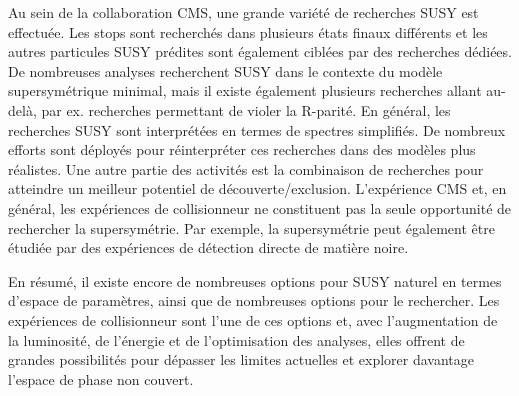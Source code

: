 Au sein de la collaboration CMS, une grande variété de recherches SUSY est effectuée. Les stops sont recherchés dans plusieurs états finaux différents et les autres particules SUSY prédites sont également ciblées par des recherches dédiées. De nombreuses analyses recherchent SUSY dans le contexte du modèle supersymétrique minimal, mais il existe également plusieurs recherches allant au-delà, par ex. recherches permettant de violer la R-parité. En général, les recherches SUSY sont interprétées en termes de spectres simplifiés. De nombreux efforts sont déployés pour réinterpréter ces recherches dans des modèles plus réalistes. Une autre partie des activités est la combinaison de recherches pour atteindre un meilleur potentiel de découverte/exclusion. L'expérience CMS et, en général, les expériences de collisionneur ne constituent pas la seule opportunité de rechercher la supersymétrie. Par exemple, la supersymétrie peut également être étudiée par des expériences de détection directe de matière noire.


En résumé, il existe encore de nombreuses options pour SUSY naturel en termes d'espace de paramètres, ainsi que de nombreuses options pour le rechercher. Les expériences de collisionneur sont l'une de ces options et, avec l'augmentation de la luminosité, de l'énergie et de l'optimisation des analyses, elles offrent de grandes possibilités pour dépasser les limites actuelles et explorer davantage l'espace de phase non couvert.

